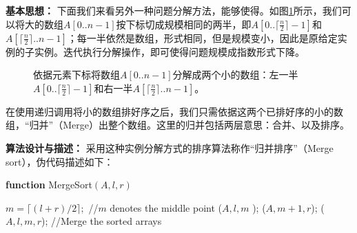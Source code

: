 {\bf 基本思想：}
下面我们来看另外一种问题分解方法，能够使得。如图\ref{An2Halves}所示，我们可以将大的数组$A[0..n-1]$按下标切成规模相同的两半，即$A[0..\lceil\frac{n}{2}\rceil-1]$和$A[\lceil\frac{n}{2}\rceil..n-1]$；每一半依然是数组，形式相同，但是规模变小，因此是原给定实例的子实例。迭代执行分解操作，即可使得问题规模成指数形式下降。

 
\begin{figure}[H]\centering\centering
    
	\caption{\fangsong 依据元素下标将数组$A[0..n-1]$分解成两个小的数组：左一半$A[0..\lceil\frac{n}{2}\rceil-1]$和右一半$A[\lceil\frac{n}{2}\rceil..n-1]$。}	
	\label{An2Halves}
\end{figure}


在使用递归调用将小的数组排好序之后，我们只需依据这两个已排好序的小的数组，“归并”（Merge）出整个数组。这里的归并包括两层意思：合并、以及排序。


{\bf 算法设计与描述：} 采用这种实例分解方式的排序算法称作“归并排序”（Merge sort）\cite{Neumann1945MergeSort}，伪代码描述如下：

\begin{algorithm}[H]
\caption{{\sc MergeSort} algorithm: Sort elements in $A[l..r]$} \label{MergeSortAlgo} 
{\bf function} {\sc MergeSort}$( A, l, r )$
\begin{algorithmic}[1] 
	\STATE $m = \lceil( l + r )/ 2\rceil; $ //$m$ denotes the middle point
	($A, l, m$ ); 
	($A,m+1, r$); 
	($A, l, m, r$); //Merge the sorted arrays 
\ENDIF
\end{algorithmic}
\end{algorithm}

